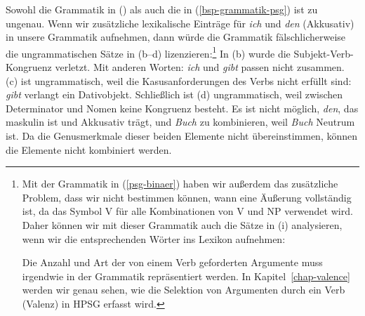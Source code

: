 Sowohl die Grammatik in () als auch die in (\ref{bsp-grammatik-psg}) ist zu ungenau.
Wenn wir zusätzliche lexikalische Einträge für \emph{ich} und \emph{den} (Akkusativ) in unsere
Grammatik aufnehmen, dann würde die Grammatik fälschlicherweise
die ungrammatischen Sätze in (b--d) lizenzieren:\footnote{\label{fn-ex-das-kind-erwartet}%
	Mit der Grammatik in (\ref{psg-binaer}) haben wir außerdem das zusätzliche Problem, dass wir nicht bestimmen können, wann eine Äußerung vollständig ist,
	da das Symbol V für alle Kombinationen von V und NP verwendet wird. Daher können wir mit dieser Grammatik auch
        die Sätze in (i) analysieren, wenn wir die entsprechenden Wörter ins Lexikon aufnehmen:

\eal
{}
\zl
Die Anzahl und Art der von einem Verb geforderten Argumente muss irgendwie in der Grammatik repräsentiert werden. In Kapitel~\ref{chap-valence} werden wir genau sehen,
wie die Selektion von Argumenten durch ein Verb (Valenz) in HPSG erfasst wird.
}
\eal
{}
\zl
In (b) wurde die Subjekt-Verb-Kongruenz verletzt. Mit anderen Worten: \emph{ich} und \emph{gibt} passen nicht zusammen.
(c) ist ungrammatisch, weil die Kasusanforderungen des Verbs nicht erfüllt sind: \emph{gibt} verlangt ein Dativobjekt. Schließlich ist (d) ungrammatisch,
weil zwischen Determinator und Nomen keine Kongruenz besteht. Es ist nicht möglich, \emph{den}, das maskulin ist und Akkusativ trägt,
und \emph{Buch} zu kombinieren, weil \emph{Buch} Neutrum ist. Da die Genusmerkmale
dieser beiden Elemente nicht übereinstimmen, können die Elemente nicht kombiniert werden.

